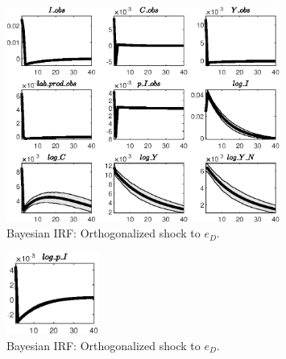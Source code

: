 \begin{figure}[H]
\centering 
\includegraphics[width=0.80\textwidth]{BRS_fd/Output/BRS_fd_Bayesian_IRF_e_D_1}
\caption{Bayesian IRF: Orthogonalized shock to ${e_D}$.}
\label{Fig:BayesianIRF:e_D:1}
\end{figure}
 
\begin{figure}[H]
\centering 
\includegraphics[width=0.27\textwidth]{BRS_fd/Output/BRS_fd_Bayesian_IRF_e_D_2}
\caption{Bayesian IRF: Orthogonalized shock to ${e_D}$.}
\label{Fig:BayesianIRF:e_D:2}
\end{figure}
 

